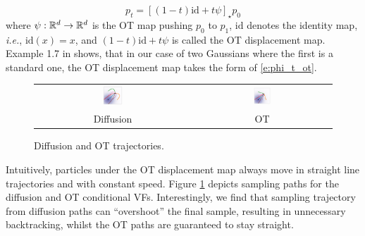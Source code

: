 \documentclass{article}
\makeatletter
\renewcommand*{\ie}{{\it i.e.}\@\xspace}
\makeatother
\begin{document}
\begin{equation}
    p_t = [(1-t)\mathrm{id} + t\psi]_\star p_0
\end{equation}
where $\psi:\mathbb R^d\rightarrow\mathbb R^d$ is the OT map pushing $p_0$ to $p_1$, $\mathrm{id}$ denotes the identity map, \ie, $\mathrm{id}(x)=x$, and $(1-t)\mathrm{id} + t\psi$ is called the OT displacement map. Example 1.7 in \cite{mccann1997convexity} shows,  that in our case of two Gaussians where the first is a standard one, the OT displacement map takes the form of \eqref{e:phi_t_ot}. 

\begin{figure}
\vspace{-30pt}
  \begin{center}
  \begin{tabular}{cc}
      \includegraphics[width=0.13\textwidth]{figures/2d_traj/2d_traj_diff.png} & \includegraphics[width=0.13\textwidth]{figures/2d_traj/2d_traj_ot.png}\vspace{-5pt} \\
      {\scriptsize Diffusion} & {\scriptsize OT}  \vspace{-10pt}
  \end{tabular}
  \end{center}
  \caption{Diffusion and OT trajectories. 
}\label{fig:trajectories}
\end{figure}
%
Intuitively, particles under the OT displacement map always move in straight line trajectories and with constant speed.
Figure \ref{fig:trajectories} depicts sampling paths for the diffusion and OT conditional VFs. 
Interestingly, we find that sampling trajectory from diffusion paths can ``overshoot'' the final sample, resulting in unnecessary backtracking, whilst the OT paths are guaranteed to stay straight. 
\end{document}
